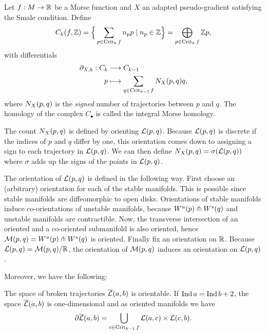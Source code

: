 \begin{definition}
    Let $f: M \to  \mathbb{R}$ be a Morse function and $X$ an adapted pseudo-gradient satisfying the Smale condition. Define
        \[
            C_k(f, \mathbb{Z}) = \Big\{ \sum_{p \in \operatorname{Crit}_k f} n_p p  \mid n_p \in \mathbb{Z} \Big\}  = \bigoplus_{p \in \operatorname{Crit}_k f} \mathbb{Z} p
        ,\] 
        with differentials
        \begin{align*}
            \partial_{X, k}: C_k &\longrightarrow C_{k-1} \\
            p &\longmapsto \sum_{q \in \operatorname{Crit}_{k-1} f} N_{X}(p, q) q
        ,\end{align*}
        where $N_{X}(p, q)$ is the \emph{signed} number of trajectories between  $p$ and $q$.
        The homology of the complex $C_\bullet$ is called the integral Morse homology.
\end{definition}

    The count $N_{X}(p, q)$ is defined by orienting  $\mathcal L(p, q)$.
    Because $\mathcal L(p, q)$ is discrete if the indices of $p$ and  $q$ differ by one, this orientation comes down to assigning a sign to each trajectory in  $\mathcal L(p, q)$. We can then define $N_{X}(p, q)  = \sigma(\mathcal L(p, q))$ where $\sigma$ adds up the signs of the points in $\mathcal L(p, q)$.

    The orientation of $\mathcal L(p, q)$ is defined in the following way.
    First choose an (arbitrary) orientation for each of the stable manifolds. This is possible since stable manifolds are diffeomorphic to open disks.
    Orientations of stable manifolds induce co-orientations of unstable manifolds, because $W^u(p) \pitchfork W^s(q)$ and unstable manifolds are contractible.
    Now, the transverse intersection of an oriented and a co-oriented submanifold is also oriented, hence $\mathcal M(p, q) = W^u(p) \pitchfork W^s(q)$ is oriented.
    Finally fix an orientation on $\mathbb{R}$.
    Because $\mathcal L(p, q) = \mathcal M(p, q) / \mathbb{R}$, the orientation of $\mathcal M(p, q)$ induces an orientation on  $\mathcal L(p, q)$.

Moreover, we have the following:
    \begin{prop}
        The space of broken trajectories $\overline{\mathcal L}(a, b)$ is orientable.
        If $\operatorname{Ind} a = \operatorname{Ind} b + 2$,  the space $\overline{\mathcal L}(a, b) $ is one-dimensional and as oriented manifolds we have
         \[
             \partial \overline{\mathcal L}(a, b) = \bigcup_{c \in \operatorname{Crit}_{k-1} f }  \mathcal L(a, c) \times  \mathcal L(c, b)
        .\] 
    \end{prop}
    
